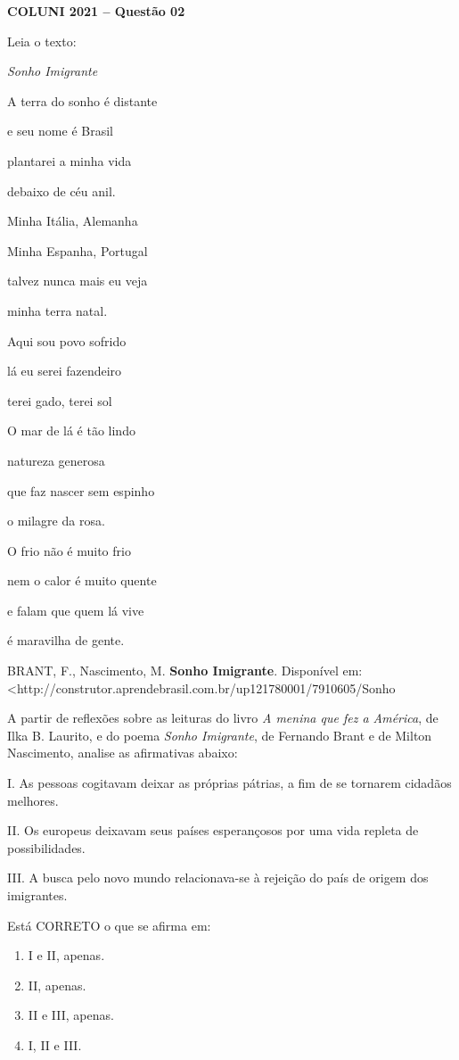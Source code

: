 \textbf{COLUNI 2021 -- Questão 02}\par\medskip Leia o texto:

\begin{center}
\textit{Sonho Imigrante}

A terra do sonho é distante

e seu nome é Brasil

plantarei a minha vida

debaixo de céu anil.

Minha Itália, Alemanha

Minha Espanha, Portugal

talvez nunca mais eu veja

minha terra natal.

Aqui sou povo sofrido

lá eu serei fazendeiro

terei gado, terei sol

O mar de lá é tão lindo

natureza generosa

que faz nascer sem espinho

o milagre da rosa.

O frio não é muito frio

nem o calor é muito quente

e falam que quem lá vive

é maravilha de gente.
\end{center}

BRANT, F., Nascimento, M. \textbf{Sonho Imigrante}. Disponível em: <http://construtor.aprendebrasil.com.br/up121780001/7910605/Sonho%

\par

A partir de reflexões sobre as leituras do livro \textit{A menina que fez a América}, de Ilka B. Laurito, e do poema \textit{Sonho Imigrante}, de Fernando Brant e de Milton Nascimento, analise as afirmativas abaixo:

\par

I. As pessoas cogitavam deixar as próprias pátrias, a fim de se tornarem cidadãos melhores.

II. Os europeus deixavam seus países esperançosos por uma vida repleta de possibilidades.

III. A busca pelo novo mundo relacionava-se à rejeição do país de origem dos imigrantes.

\par

Está CORRETO o que se afirma em:
\begin{enumerate}
\item I e II, apenas.
\item II, apenas.
\item II e III, apenas.
\item I, II e III.
\end{enumerate}
